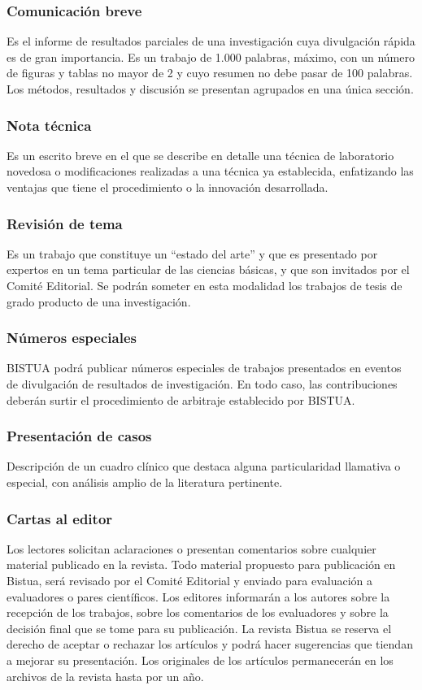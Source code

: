 \documentclass[10pt,letterpaper,twocolumn,twoside,fleqn]{article}
\begin{document}
\subsubsection{Comunicación breve}
Es el informe de resultados parciales de una investigación cuya divulgación rápida es de gran importancia. Es un trabajo de 1.000 palabras, máximo, con un número de figuras y tablas no mayor de 2 y cuyo resumen no debe pasar de 100 palabras.\\
Los métodos, resultados y discusión se presentan agrupados en una única sección.
\subsubsection{Nota técnica}
Es un escrito breve en el que se describe en detalle una técnica de laboratorio novedosa o modificaciones realizadas a una técnica ya establecida, enfatizando las ventajas que tiene el procedimiento o la innovación desarrollada.
\subsubsection{Revisión de tema}
 Es un trabajo que constituye un ``estado del arte'' y que es presentado por expertos en un tema particular de las ciencias básicas, y que son invitados por el Comité Editorial. Se podrán someter en esta modalidad los trabajos de tesis de grado producto de una investigación.
\subsubsection{Números especiales } 
BISTUA podrá publicar números especiales de trabajos presentados en eventos de divulgación de resultados de investigación. En todo caso, las contribuciones deberán surtir el procedimiento de arbitraje establecido por BISTUA.
\subsubsection{Presentación de casos } 
Descripción de un cuadro clínico que destaca alguna particularidad llamativa o especial, con análisis amplio de la literatura pertinente.
\subsubsection{Cartas al editor} 
 Los lectores solicitan aclaraciones o presentan comentarios sobre cualquier material publicado en la revista. Todo material propuesto para publicación en Bistua, será revisado por el Comité Editorial y enviado para evaluación a evaluadores o pares científicos. Los editores informarán a los autores sobre la recepción de los trabajos, sobre los comentarios de los evaluadores y sobre la decisión final que se tome para su publicación. La revista Bistua se reserva el derecho de aceptar o rechazar los artículos y podrá hacer sugerencias que tiendan a mejorar su presentación. Los originales de los artículos permanecerán en los archivos de la revista hasta por un año.
\end{document}
